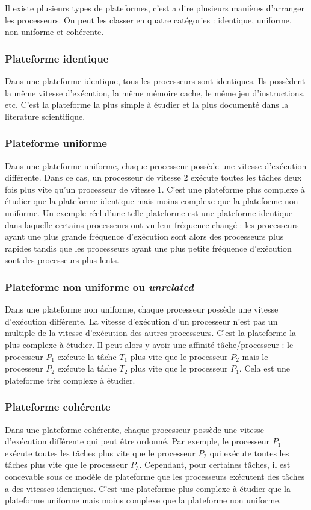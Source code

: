 Il existe plusieurs types de plateformes, c'est a dire plusieurs manières d’arranger les processeurs. On peut les classer en quatre catégories : identique, uniforme, non uniforme et cohérente.
\subsubsection{Plateforme identique}
Dans une plateforme identique, tous les processeurs sont identiques. Ils possèdent la même vitesse d'exécution, la même mémoire cache, le même jeu d'instructions, etc. C'est la plateforme la plus simple à étudier et la plus documenté dans la literature scientifique. 

\subsubsection{Plateforme uniforme}
Dans une plateforme uniforme, chaque processeur possède une vitesse d'exécution différente. Dans ce cas, un processeur de vitesse 2 exécute toutes les tâches deux fois plus vite qu'un processeur de vitesse 1. C'est une plateforme plus complexe à étudier que la plateforme identique mais moins complexe que la plateforme non uniforme. Un exemple réel d'une telle plateforme est une plateforme identique dans laquelle certains processeurs ont vu leur fréquence changé : les processeurs ayant une plus grande fréquence d'exécution sont alors des processeurs plus rapides tandis que les processeurs ayant une plus petite fréquence d'exécution sont des processeurs plus lents. 

\subsubsection{Plateforme non uniforme ou \textit{unrelated}}
Dans une plateforme non uniforme, chaque processeur possède une vitesse d'exécution différente. La vitesse d'exécution d'un processeur n'est pas un multiple de la vitesse d'exécution des autres processeurs. C'est la plateforme la plus complexe à étudier. Il peut alors y avoir une affinité tâche/processeur : le processeur $P_1$ exécute la tâche $T_1$ plus vite que le processeur $P_2$ mais le processeur $P_2$ exécute la tâche $T_2$ plus vite que le processeur $P_1$. Cela est une plateforme très complexe à étudier.

\subsubsection{Plateforme cohérente}
Dans une plateforme cohérente, chaque processeur possède une vitesse d'exécution différente qui peut être ordonné. Par exemple, le processeur $P_1$ exécute toutes les tâches plus vite que le processeur $P_2$ qui exécute toutes les tâches plus vite que le processeur $P_3$. Cependant, pour certaines tâches, il est concevable sous ce modèle de plateforme que les processeurs exécutent des tâches a des vitesses identiques. C'est une plateforme plus complexe à étudier que la plateforme uniforme mais moins complexe que la plateforme non uniforme.

